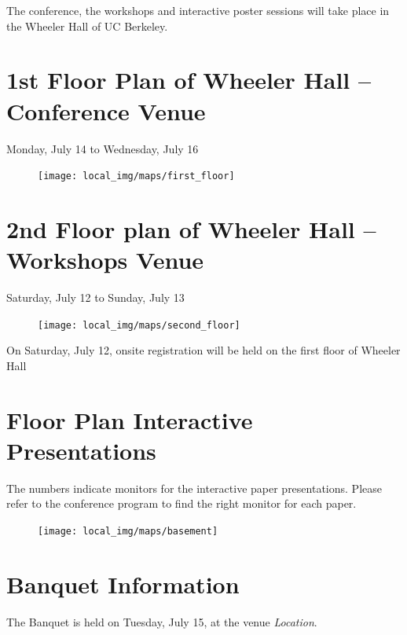 The conference, the workshops and interactive poster sessions will take place in the Wheeler Hall of UC Berkeley. 

\newpage
{} \section{1st Floor Plan of Wheeler Hall -- Conference Venue}
Monday, July 14 to Wednesday, July 16
\begin{figure}[h!]
\center
\texttt{[image: local\_img/maps/first\_floor]}
\end{figure}

\newpage
{} \section{2nd Floor plan of Wheeler Hall -- Workshops Venue}
Saturday, July 12 to Sunday, July 13

\begin{figure}[h!]
\center
\texttt{[image: local\_img/maps/second\_floor]}
\end{figure}

\vspace{1.0cm}
{On Saturday, July 12, onsite registration will be held on the first floor of Wheeler Hall}

\clearpage

 \section{Floor Plan Interactive Presentations}

The numbers indicate monitors for the interactive paper presentations. Please refer to the conference program to find the right monitor for each paper.
\begin{figure}[h!]
\center
\texttt{[image: local\_img/maps/basement]}
\end{figure}



 \section{Banquet Information}
The Banquet is held on Tuesday, July 15, at the venue \emph{Location}.


